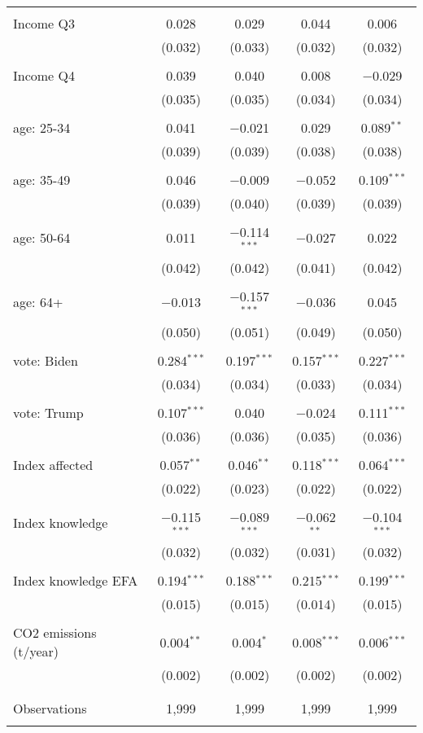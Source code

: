 \begin{tabular}{@{\extracolsep{5pt}}lcccc}
  & & & & \\ 
 Income Q3 & 0.028 & 0.029 & 0.044 & 0.006 \\ 
  & (0.032) & (0.033) & (0.032) & (0.032) \\ 
  & & & & \\ 
 Income Q4 & 0.039 & 0.040 & 0.008 & $-$0.029 \\ 
  & (0.035) & (0.035) & (0.034) & (0.034) \\ 
  & & & & \\ 
 age: 25-34 & 0.041 & $-$0.021 & 0.029 & 0.089$^{**}$ \\ 
  & (0.039) & (0.039) & (0.038) & (0.038) \\ 
  & & & & \\ 
 age: 35-49 & 0.046 & $-$0.009 & $-$0.052 & 0.109$^{***}$ \\ 
  & (0.039) & (0.040) & (0.039) & (0.039) \\ 
  & & & & \\ 
 age: 50-64 & 0.011 & $-$0.114$^{***}$ & $-$0.027 & 0.022 \\ 
  & (0.042) & (0.042) & (0.041) & (0.042) \\ 
  & & & & \\ 
 age: 64+ & $-$0.013 & $-$0.157$^{***}$ & $-$0.036 & 0.045 \\ 
  & (0.050) & (0.051) & (0.049) & (0.050) \\ 
  & & & & \\ 
 vote: Biden & 0.284$^{***}$ & 0.197$^{***}$ & 0.157$^{***}$ & 0.227$^{***}$ \\ 
  & (0.034) & (0.034) & (0.033) & (0.034) \\ 
  & & & & \\ 
 vote: Trump & 0.107$^{***}$ & 0.040 & $-$0.024 & 0.111$^{***}$ \\ 
  & (0.036) & (0.036) & (0.035) & (0.036) \\ 
  & & & & \\ 
 Index affected & 0.057$^{**}$ & 0.046$^{**}$ & 0.118$^{***}$ & 0.064$^{***}$ \\ 
  & (0.022) & (0.023) & (0.022) & (0.022) \\ 
  & & & & \\ 
 Index knowledge & $-$0.115$^{***}$ & $-$0.089$^{***}$ & $-$0.062$^{**}$ & $-$0.104$^{***}$ \\ 
  & (0.032) & (0.032) & (0.031) & (0.032) \\ 
  & & & & \\ 
 Index knowledge EFA & 0.194$^{***}$ & 0.188$^{***}$ & 0.215$^{***}$ & 0.199$^{***}$ \\ 
  & (0.015) & (0.015) & (0.014) & (0.015) \\ 
  & & & & \\ 
 CO2 emissions (t/year) & 0.004$^{**}$ & 0.004$^{*}$ & 0.008$^{***}$ & 0.006$^{***}$ \\ 
  & (0.002) & (0.002) & (0.002) & (0.002) \\ 
  & & & & \\ 
\hline \\[-1.8ex] 

Observations & 1,999 & 1,999 & 1,999 & 1,999 \\ 
\hline 
\hline \\[-1.8ex] 
\end{tabular} 